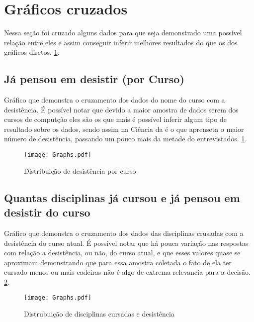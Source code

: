 \documentclass[11pt]{scrartcl} %
\begin{document}

\section{Gráficos cruzados}\label{sec:cross}

Nessa seção foi cruzado alguns dados para que seja demonstrado uma possível relação entre eles e assim conseguir inferir melhores resultados do que os dos gráficos diretos. \ref{fig:graph10}.

\subsection{Já pensou em desistir (por Curso)}

Gráfico que demonstra o cruzamento dos dados do nome do curso com a desistência. É possível notar que devido a maior amostra de dados serem dos cursos de computção eles são os que mais é possível inferir algum tipo de resultado sobre os dados, sendo assim na Ciência da é o que aprenseta o maior número de desistência, passando um pouco mais da metade do entrevistados. \ref{fig:graph10}.

\begin{figure}[h]
  \centering
  \texttt{[image: Graphs.pdf]}
  \label{fig:graph10}
  \caption{Distribuição de desistência por curso}
\end{figure}

\subsection{Quantas disciplinas já cursou e já pensou em desistir do curso}

Gráfico que demonstra o cruzamento dos dados das disciplinas crusadas com a desistência do curso atual. É possível notar que há pouca variação nas respostas com relação a desistência, ou não, do curso atual, e que esses valores quase se aproximam demonstrando que para essa amostra coletada o fato de ela ter cursado menos ou mais cadeiras não é algo de extrema relevancia para a decisão. \ref{fig:graph11}.

\begin{figure}[h]
  \centering
  \texttt{[image: Graphs.pdf]}
  \label{fig:graph11}
  \caption{Distrubuição de disciplinas cursadas e desistência}
\end{figure}
\end{document}
